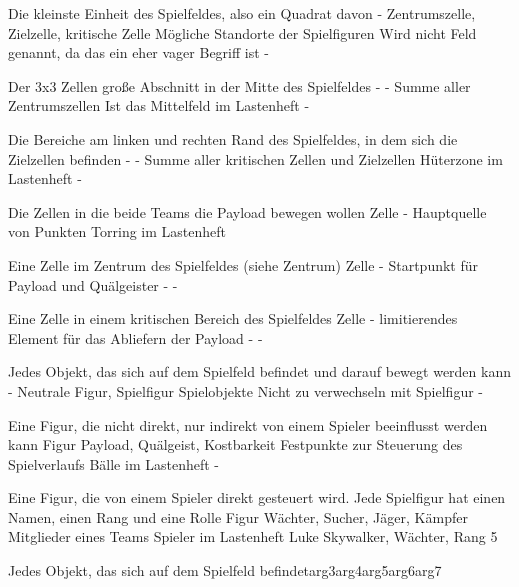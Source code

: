 	{Die kleinste Einheit des Spielfeldes, also ein Quadrat davon}
	{-}
	{Zentrumszelle, Zielzelle, kritische Zelle}
	{Mögliche Standorte der Spielfiguren}
	{Wird nicht Feld genannt, da das ein eher vager Begriff ist}
	{-}
	
	{Der 3x3 Zellen große Abschnitt in der Mitte des Spielfeldes}
	{-}
	{-}
	{Summe aller Zentrumszellen}
	{Ist das Mittelfeld im Lastenheft}
	{-}
	
	{Die Bereiche am linken und rechten Rand des Spielfeldes, in dem sich die Zielzellen befinden}
	{-}
	{-}
	{Summe aller kritischen Zellen und Zielzellen}
	{Hüterzone im Lastenheft}
	{-}
	
	{Die Zellen in die beide Teams die Payload bewegen wollen}
	{Zelle}
	{-}
	{Hauptquelle von Punkten}
	{Torring im Lastenheft}
	{}
	
	{Eine Zelle im Zentrum des Spielfeldes (siehe Zentrum)}
	{Zelle}
	{-}
	{Startpunkt für Payload und Quälgeister}
	{-}
	{-}
	
	{Eine Zelle in einem kritischen Bereich des Spielfeldes}
	{Zelle}
	{-}
	{limitierendes Element für das Abliefern der Payload}
	{-}
	{-}
	
	{Jedes Objekt, das sich auf dem Spielfeld befindet und darauf bewegt werden kann}
	{-}
	{Neutrale Figur, Spielfigur}
	{Spielobjekte}
	{Nicht zu verwechseln mit Spielfigur}
	{-}
	
	{Eine Figur, die nicht direkt, nur indirekt von einem Spieler beeinflusst werden kann}
	{Figur}
	{Payload, Quälgeist, Kostbarkeit}
	{Festpunkte zur Steuerung des Spielverlaufs}
	{Bälle im Lastenheft}
	{-}
	
	{Eine Figur, die von einem Spieler direkt gesteuert wird. Jede Spielfigur hat einen Namen, einen Rang und eine Rolle}
	{Figur}
	{Wächter, Sucher, Jäger, Kämpfer}
	{Mitglieder eines Teams}
	{Spieler im Lastenheft}
	{Luke Skywalker, Wächter, Rang 5}
	
	
	{Jedes Objekt, das sich auf dem Spielfeld befindet}{arg3}{arg4}{arg5}{arg6}{arg7}
